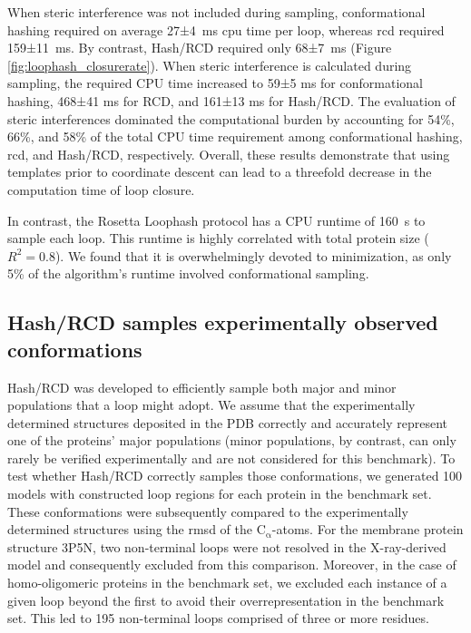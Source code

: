 When steric interference was not included during sampling, conformational hashing required on average 27±\SI{4}{ms} \gls{cpu} time per loop, whereas \gls{rcd} required 159±\SI{11}{ms}. By contrast, Hash/RCD required only 68±\SI{7}{ms} (Figure \ref{fig:loophash_closurerate}). When steric interference is calculated during sampling, the required CPU time increased to 59±5 ms for conformational hashing, 468±41 ms for RCD, and 161±13 ms for Hash/RCD. The evaluation of steric interferences dominated the computational burden by accounting for 54\%, 66\%, and 58\% of the total CPU time requirement among conformational hashing, \gls{rcd}, and Hash/RCD, respectively. Overall, these results demonstrate that using templates prior to coordinate descent can lead to a threefold decrease in the computation time of loop closure.

In contrast, the Rosetta Loophash protocol has a CPU runtime of \SI{160}{s} to sample each loop. This runtime is highly correlated with total protein size ($R^2=0.8$). We found that it is overwhelmingly devoted to minimization, as only 5\% of the algorithm's runtime involved conformational sampling.

\newpage

\subsection{Hash/RCD samples experimentally observed conformations}

Hash/RCD was developed to efficiently sample both major and minor populations that a loop might adopt. We assume that the experimentally determined structures deposited in the PDB correctly and accurately represent one of the proteins’ major populations (minor populations, by contrast, can only rarely be verified experimentally and are not considered for this benchmark). To test whether Hash/RCD correctly samples those conformations, we generated 100 models with constructed loop regions for each protein in the benchmark set. These conformations were subsequently compared to the experimentally determined structures using the \gls{rmsd} of the $\mathrm{C_{\upalpha}}$-atoms. For the membrane protein structure 3P5N, two non-terminal loops were not resolved in the X-ray-derived model and consequently excluded from this comparison. Moreover, in the case of homo-oligomeric proteins in the benchmark set, we excluded each instance of a given loop beyond the first to avoid their overrepresentation in the benchmark set. This led to 195 non-terminal loops comprised of three or more residues.

